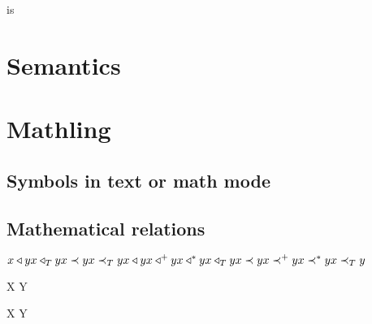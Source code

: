 \documentclass{khplain}
\begin{document}
\begin{examplebox}
 is 
\end{examplebox}


\section{Semantics}

\begin{examplebox}
 \par
\typeet \par
\typeeet \par
\typeett \par
\typeetet
\end{examplebox}

\begin{examplebox}
\end{examplebox}


\section{Mathling}

\subsection{Symbols in text or math mode}

\begin{examplebox}
    \ledge \redge \tedge \bedge \slot
\end{examplebox}

\subsection{Mathematical relations}

\begin{examplebox}
\begin{math}
x \triangleleft y \\
x \triangleleft_T y \\
x \prec y \\
x \prec_T y \\
x \triangleleft y \\
x \triangleleft^+ y \\
x \triangleleft^* y \\
x \triangleleft_T y \\
x \prec y \\
x \prec^+ y \\
x \prec^* y \\
x \prec_T y
\end{math}
\end{examplebox}

\begin{examplebox}
 \par
{} \par
X \mergedot Y \par
X \movedot Y \par
\end{examplebox}
\end{document}
